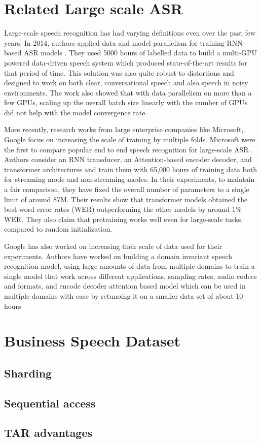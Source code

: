 \section{Related Large scale ASR}
Large-scale speech recognition has had varying definitions even over the past few years. In 2014, authors applied data and model parallelism for training RNN-based ASR models \cite{Hannun2014DeepRecognition}. They used 5000 hours of labelled data to build a multi-GPU powered data-driven speech system which produced state-of-the-art results for that period of time. This solution was also quite robust to distortions and designed to work on both clear, conversational speech and also speech in noisy environments. The work also showed that with data parallelism on more than a few GPUs, scaling up the overall batch size linearly with the number of GPUs did not help with the model convergence rate.

More recently, research works from large enterprise companies like Microsoft, Google focus on increasing the scale of training by multiple folds. Microsoft were the first to compare popular end to end speech recognition for large-scale ASR \cite{Li2020OnRecognition}. Authors consider an RNN transducer, an Attention-based encoder decoder, and transformer architectures and train them with 65,000 hours of training data both for streaming mode and non-streaming modes. In their experiments, to maintain a fair comparison, they have fixed the overall number of parameters to a single limit of around 87M. Their results show that transformer models obtained the best word error rates (WER) outperforming the other models by around 1\% WER. They also claim that pretraining works well even for large-scale tasks, compared to random initialization.

Google has also worked on increasing their scale of data used for their experiments. Authors have worked on building a domain invariant speech recognition model, using large amounts of data from multiple domains to train a single model that work across different applications, sampling rates, audio codecs and formats, and  encode decoder attention based model which can be used in multiple domains with  ease by retunoing it on a smaller data set of about 10 hours 
 
 
\section{Business Speech Dataset}

\subsection{Sharding}
\subsection{Sequential access}
\subsection{TAR advantages}

